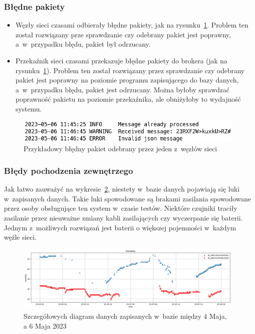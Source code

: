 \subsubsection{Błędne pakiety}
\begin{itemize}
    \item Węzły sieci czasami odbierały błędne pakiety, jak na rysunku~\ref{rys:zly-pakiet}. Problem ten został rozwiązany prze sprawdzanie czy odebrany pakiet jest poprawny, a~w~przypadku błędu, pakiet był odrzucany.
    \item Przekaźnik sieci czasami przekazuje błędne pakiety do brokera (jak na rysunku~\ref{rys:zly-pakiet}). Problem ten został rozwiązany przez sprawdzanie czy odebrany pakiet jest poprawny na poziomie programu zapisującego do bazy danych, a~w~przypadku błędu, pakiet jest odrzucany. Można byłoby sprawdzać poprawność pakietu na poziomie przekaźnika, ale obniżyłoby to wydajność systemu.
\end{itemize}

\begin{figure}[b!]
    \begin{center}
        \includegraphics[width=13cm]{pic/zly-pakiet.png}
    \end{center}
    \caption{Przykładowy błędny pakiet odebrany przez jeden z~węzłów sieci}\label{rys:zly-pakiet}
\end{figure}

\subsubsection{Błędy pochodzenia zewnętrzego}
Jak łatwo zauważyć na wykresie~\ref{rys:diagram-scat}, niestety w~bazie danych pojawiają się luki w~zapisanych danych.
Takie luki spowodowane są brakami zasilania spowodowane przez osoby obsługujące ten system w~czasie testów.
Niektóre czujniki traciły zasilanie przez nieuważne zmiany kabli zasilających czy wyczerpanie się baterii.
Jednym z~możliwych rozwiązań jest baterii o większej pojemności w~każdym węźle sieci.

\begin{figure}[b!]
    \begin{center}
        \includegraphics[width=13cm]{pic/diagram-scat-humm.png}
    \end{center}
    \caption{Szczegółowych diagram danych zapisanych w~bazie między 4 Maja, a 6 Maja 2023}\label{rys:diagram-scat}
\end{figure}

